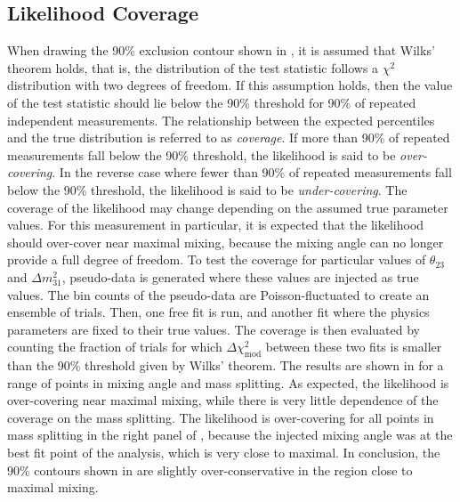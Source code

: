 \subsection{Likelihood Coverage}

When drawing the 90\% exclusion contour shown in , it is assumed that Wilks' theorem holds, that is, the distribution of the test statistic follows a $\chi^2$ distribution with two degrees of freedom. If this assumption holds, then the value of the test statistic should lie below the 90\% threshold for 90\% of repeated independent measurements. The relationship between the expected percentiles and the true distribution is referred to as \emph{coverage}. If more than 90\% of repeated measurements fall below the 90\% threshold, the likelihood is said to be \emph{over-covering}. In the reverse case where fewer than 90\% of repeated measurements fall below the 90\% threshold, the likelihood is said to be \emph{under-covering}. The coverage of the likelihood may change depending on the assumed true parameter values. For this measurement in particular, it is expected that the likelihood should over-cover near maximal mixing, because the mixing angle can no longer provide a full degree of freedom. To test the coverage for particular values of $\theta_{23}$ and $\Delta m^2_{31}$, pseudo-data is generated where these values are injected as true values. The bin counts of the pseudo-data are Poisson-fluctuated to create an ensemble of trials. Then, one free fit is run, and another fit where the physics parameters are fixed to their true values. The coverage is then evaluated by counting the fraction of trials for which $\Delta \chi^2_{\mathrm{mod}}$ between these two fits is smaller than the 90\% threshold given by Wilks' theorem. The results are shown in  for a range of points in mixing angle and mass splitting. As expected, the likelihood is over-covering near maximal mixing, while there is very little dependence of the coverage on the mass splitting. The likelihood is over-covering for all points in mass splitting in the right panel of , because the injected mixing angle was at the best fit point of the analysis, which is very close to maximal. In conclusion, the 90\% contours shown in  are slightly over-conservative in the region close to maximal mixing.

